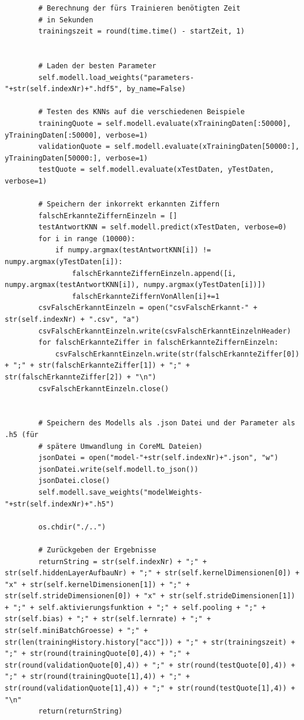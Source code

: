 \documentclass[a4paper,12pt,ngerman,oneside]{scrreprt}	%
\begin{document}
{\begin{lstlisting}
		# Berechnung der fürs Trainieren benötigten Zeit
		# in Sekunden
		trainingszeit = round(time.time() - startZeit, 1)
		
		
		# Laden der besten Parameter
		self.modell.load_weights("parameters-"+str(self.indexNr)+".hdf5", by_name=False)
		
		# Testen des KNNs auf die verschiedenen Beispiele
		trainingQuote = self.modell.evaluate(xTrainingDaten[:50000], yTrainingDaten[:50000], verbose=1)
		validationQuote = self.modell.evaluate(xTrainingDaten[50000:], yTrainingDaten[50000:], verbose=1)
		testQuote = self.modell.evaluate(xTestDaten, yTestDaten, verbose=1)
		
		# Speichern der inkorrekt erkannten Ziffern
		falschErkannteZiffernEinzeln = []
		testAntwortKNN = self.modell.predict(xTestDaten, verbose=0)
		for i in range (10000):
			if numpy.argmax(testAntwortKNN[i]) != numpy.argmax(yTestDaten[i]):
				falschErkannteZiffernEinzeln.append([i, numpy.argmax(testAntwortKNN[i]), numpy.argmax(yTestDaten[i])])
				falschErkannteZiffernVonAllen[i]+=1
		csvFalschErkanntEinzeln = open("csvFalschErkannt-" + str(self.indexNr) + ".csv", "a")
		csvFalschErkanntEinzeln.write(csvFalschErkanntEinzelnHeader)
		for falschErkannteZiffer in falschErkannteZiffernEinzeln:
			csvFalschErkanntEinzeln.write(str(falschErkannteZiffer[0]) + ";" + str(falschErkannteZiffer[1]) + ";" + str(falschErkannteZiffer[2]) + "\n")
		csvFalschErkanntEinzeln.close()
		
		
		# Speichern des Modells als .json Datei und der Parameter als .h5 (für 
		# spätere Umwandlung in CoreML Dateien)
		jsonDatei = open("model-"+str(self.indexNr)+".json", "w")
		jsonDatei.write(self.modell.to_json())
		jsonDatei.close()
		self.modell.save_weights("modelWeights-"+str(self.indexNr)+".h5")
		
		os.chdir("./..")
		
		# Zurückgeben der Ergebnisse
		returnString = str(self.indexNr) + ";" + str(self.hiddenLayerAufbauNr) + ";" + str(self.kernelDimensionen[0]) + "x" + str(self.kernelDimensionen[1]) + ";" + str(self.strideDimensionen[0]) + "x" + str(self.strideDimensionen[1]) + ";" + self.aktivierungsfunktion + ";" + self.pooling + ";" + str(self.bias) + ";" + str(self.lernrate) + ";" + str(self.miniBatchGroesse) + ";" + str(len(trainingHistory.history["acc"])) + ";" + str(trainingszeit) + ";" + str(round(trainingQuote[0],4)) + ";" + str(round(validationQuote[0],4)) + ";" + str(round(testQuote[0],4)) + ";" + str(round(trainingQuote[1],4)) + ";" + str(round(validationQuote[1],4)) + ";" + str(round(testQuote[1],4)) + "\n"
		return(returnString)




\end{lstlisting}}
\end{document}
